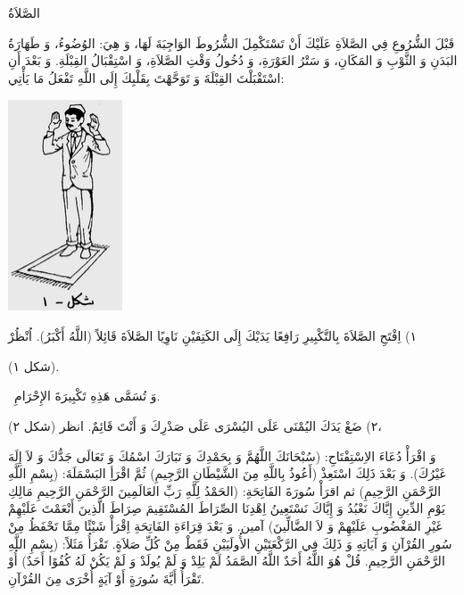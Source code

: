 \documentclass[a5paper]{article}
\begin{document}
الصَّلاَةُ

قَبْلَ الشُّرُوعِ فِي الصَّلاَةِ عَلَيْكَ أَنْ تَسْتَكْمِلَ الشُّرُوطَ الوَاجِبَةَ لَهَا، وَ هِيَ: الوُضُوءُ، وَ طَهَارَةُ البَدَنِ وَ الثَّوْبِ وَ المَكَانِ، وَ سَتْرُ العَوْرَةِ، وَ دُخُولُ وَقْتِ الصَّلاَةِ، وَ اسْتِقْبَالُ القِبْلَةِ. وَ بَعْدَ أَنِ اسْتَقْبَلْتَ القِبْلَةَ وَ تَوَحَّهْتَ بِقَلْبِكَ إِلَى اللَّهِ تَفْعَلُ مَا يَأْتِي:

\begin{center}
\includegraphics[width=1.3299in,height=2.4717in]{MuhammadBagauddinlatinized-img345.png}
\end{center}
١) اِفْتَحِ الصَّلاَةَ بِالتَّكْبِيرِ رَافِعًا يَدَيْكَ إِلَى الكَتِفَيْنِ نَاوِيًا الصَّلاَةَ قَائِلاً (اللَّهُ أَكْبَرُ). اُنْظُرْ 

(شكل ١).

\ وَ تُسَمَّى هَذِهِ تَكْبِيرَةَ الإِحْرَامِ. 

٢) ضَعْ يَدَكَ اليُمْنَى عَلَى اليُسْرَى عَلَى صَدْرِكَ وَ أَنْتَ قَائِمٌ. انظر (شكل ٢)،

وَ اقْرَأْ دُعَاءَ الاِسْتِفْتَاحِ: (سُبْحَانَكَ اللَّهُمَّ وَ بِحَمْدِكَ وَ تَبَارَكَ اسْمُكَ وَ تَعَالَى جَدُّكَ وَ لاَ إِلَهَ غَيْرُكَ). وَ بَعْدَ ذَلِكَ اسْتَعِذْ (أَعُوذُ بِاللَّهِ مِنَ الشَّيْطَانِ الرَّجِيمِ) ثُمَّ اقْرَأِ البَسْمَلَةَ: (بِسْمِ اللَّهِ الرَّحْمَنِ الرَّحِيمِ) ثم اقرَأْ سُورَةَ الفَاتِحَةِ: (الحَمْدُ لِلَّهِ رَبِّ العَالَمِينَ الرَّحْمَنِ الرَّحِيمِ مَالِكِ يَوْمِ الدِّينِ إِيَّاكَ نَعْبُدُ وَ إِيَّاكَ نَسْتَعِينُ اِهْدِنَا الصِّرَاطَ المُسْتَقِيمَ صِرَاطَ الَّذِينَ أَنْعَمْتَ عَلَيْهِمْ غَيْرِ المَغْضُوبِ عَلَيْهِمْ وَ لاَ الضَّالِّينَ) آمين. وَ بَعْدَ قِرَاءَةِ الفَاتِحَةِ اِقْرَأْ شَيْئًا مِمَّا تَحْفَظُ مِنْ سُورِ القُرْآنِ وَ آيَاتِهِ وَ ذَلِكَ فِي الرَّكْعَتَيْنِ الأُولَيَيْنِ فَقَطْ مِنْ كُلِّ صَلاَةٍ. تَقْرَأُ مَثَلاً: (بِسْمِ اللَّهِ الرَّحْمَنِ الرَّحِيمِ. قُلْ هُوَ اللَّهُ أَحَدٌ اللَّهُ الصَّمَدُ لَمْ يَلِدْ وَ لَمْ يُولَدْ وَ لَمْ يَكُنْ لَهُ كُفُوًا أَحَدٌ) أُوْ تَقْرَأُ أَيَّةَ سُورَةٍ أَوْ آيَةٍ أُخْرَى مِنَ القُرْآنِ.
\end{document}
